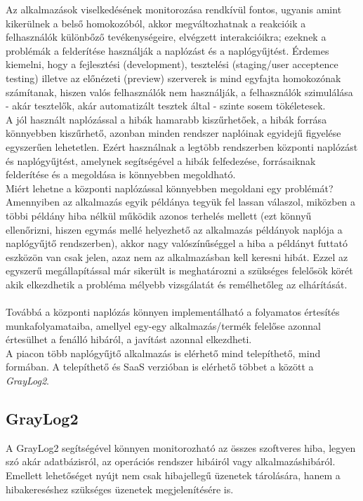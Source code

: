 Az alkalmazások viselkedésének monitorozása rendkívül fontos, ugyanis amint kikerülnek a belső homokozóból, akkor megváltozhatnak a reakcióik a felhasználók különbőző tevékenységeire, elvégzett interakcióikra; ezeknek a problémák a felderítése használják a naplózást és a naplógyűjtést. Érdemes kiemelni, hogy a fejlesztési (development), tesztelési (staging/user acceptence testing) illetve az előnézeti (preview) szerverek is mind egyfajta homokozónak számítanak, hiszen valós felhasználók nem használják, a felhasználók szimulálása - akár tesztelők, akár automatizált tesztek által - szinte sosem tökéletesek.
\\
A jól használt naplózással a hibák hamarabb kiszűrhetőek, a hibák forrása könnyebben kiszűrhető, azonban minden rendszer naplóinak egyidejű figyelése egyszerűen lehetetlen. Ezért használnak a legtöbb rendszerben központi naplózást és naplógyűjtést, amelynek segítségével a hibák felfedezése, forrásaiknak felderítése és a megoldása is könnyebben megoldható.\\
Miért lehetne a központi naplózással könnyebben megoldani egy problémát? Amennyiben az alkalmazás egyik példánya tegyük fel lassan válaszol, miközben a többi példány hiba nélkül működik azonos terhelés mellett (ezt könnyű ellenőrizni, hiszen egymás mellé helyezhető az alkalmazás példányok naplója a naplógyűjtő rendszerben), akkor nagy valószínűséggel a hiba a példányt futtató eszközön van csak jelen, azaz nem az alkalmazásban kell keresni hibát. Ezzel az egyszerű megállapítással már sikerült is meghatározni a szükséges felelősök körét akik elkezdhetik a probléma mélyebb vizsgálatát és remélhetőleg az elhárítását.\\
\hfill\\
Továbbá a központi naplózás könnyen implementálható a folyamatos értesítés munkafolyamataiba, amellyel egy-egy alkalmazás/termék felelőse azonnal értesülhet a fenálló hibáról, a javítást azonnal elkezdheti.
\hfill\\ 
A piacon több naplógyűjtő alkalmazás is elérhető mind telepíthető, mind  formában. A telepíthető és SaaS verzióban is elérhető többet a között a \emph{GrayLog2}.
\\
\subsection{GrayLog2}
A GrayLog2 segítségével könnyen monitorozható az összes szoftveres hiba, legyen szó akár adatbázisról, az operációs rendszer hibáiról vagy alkalmazáshibáról. Emellett lehetőséget nyújt nem csak hibajellegű üzenetek tárolására, hanem a hibakereséshez szükséges üzenetek megjelenítésére is.

